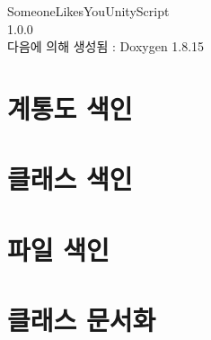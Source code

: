 \let\mypdfximage\pdfximage\def\pdfximage{\immediate\mypdfximage}\documentclass[twoside]{book}
\newcommand{\+}{\discretionary{\mbox{\scriptsize$\hookleftarrow$}}{}{}}
\newcommand{\clearemptydoublepage}{%
  \newpage{\pagestyle{empty}\cleardoublepage}%
}
\begin{document}
\hypersetup{pageanchor=false,
             bookmarksnumbered=true,
             pdfencoding=unicode
            }
\begin{titlepage}
\vspace*{7cm}
\begin{center}%
{\Large Someone\+Likes\+You\+Unity\+Script \\[1ex]\large 1.\+0.\+0 }\\
\vspace*{1cm}
{\large 다음에 의해 생성됨 \+:  Doxygen 1.8.15}\\
\end{center}
\end{titlepage}
\clearemptydoublepage
{}
\tableofcontents
\clearemptydoublepage
{}
\hypersetup{pageanchor=true}

\chapter{계통도 색인}

\chapter{클래스 색인}

\chapter{파일 색인}

\chapter{클래스 문서화}































\end{document}
